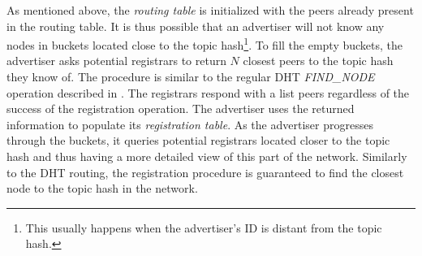 As mentioned above, the \emph{routing table} is initialized with the peers already present in the routing table. It is thus possible that an advertiser will not know any nodes in buckets located close to the topic hash\footnote{This usually happens when the advertiser's ID is distant from the topic hash.}. 
To fill the empty buckets, the advertiser asks potential registrars to return $N$ closest peers to the topic hash they know of. 
The procedure is similar to the regular DHT \emph{FIND\_NODE} operation described in . 
The registrars respond with a list peers regardless of the success of the registration operation. 
The advertiser uses the returned information to populate its \emph{registration table}. 
As the advertiser progresses through the buckets, it queries potential registrars located closer to the topic hash and thus having a more detailed view of this part of the network. 
Similarly to the DHT routing, the registration procedure is guaranteed to find the closest node to the topic hash in the network. 





